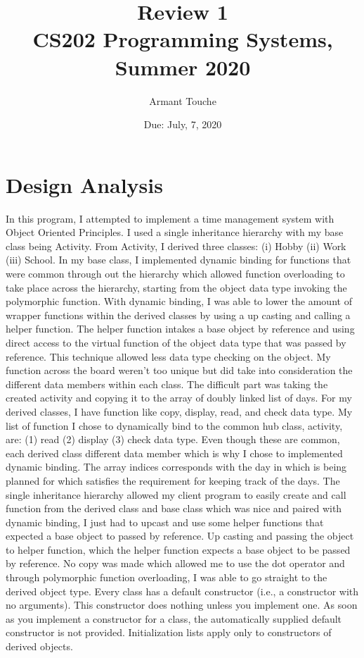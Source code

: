 \documentclass[11pt, a4paper]{article}
\title{\bf Review 1\\[1ex]
\rm\normalsize CS202 Programming Systems, Summer 2020 }
\date{\normalsize Due: July, 7, 2020}
\author{\normalsize Armant Touche}
\begin{document}
\vspace{0cm}\maketitle 

\section*{Design Analysis}

In this program, I attempted to implement a time management system with Object Oriented Principles. I used a single inheritance hierarchy with my base class being Activity. From Activity, I derived three classes: (i) Hobby (ii) Work (iii) School. In my base class, I implemented dynamic binding for functions that were common through out the hierarchy which allowed function overloading to take place across the hierarchy, starting from the object data type invoking the polymorphic function. With dynamic binding, I was able to lower the amount of wrapper functions within the derived classes by using a up casting and calling a helper function. The helper function intakes a base object by reference and using direct access to the virtual function of the object data type that was passed by reference. This technique allowed less data type checking on the object. My function across the board weren't too unique but did take into consideration the different data members within each class. The difficult part was taking the created activity and copying it to the array of doubly linked list of days. For my derived classes, I have function like copy, display, read, and check data type. My list of function I chose to dynamically bind to the common hub class, activity, are: (1) read (2) display (3) check data type. Even though these are common, each derived class different data member which is why I chose to implemented dynamic binding. The array indices corresponds with the day in which is being planned for which satisfies the requirement for keeping track of the days. The single inheritance hierarchy allowed my client program to easily create and call function from the derived class and base class which was nice and paired with dynamic binding, I just had to upcast and use some helper functions that expected a base object to passed by reference. Up casting and passing the object to helper function, which the helper function expects a base object to be passed by reference. No copy was made which allowed me to use the dot operator and through polymorphic function overloading, I was able to go straight to the derived object type. Every class has a default constructor (i.e., a constructor with no arguments). This constructor does nothing unless you implement one. As soon as you implement a constructor for a class, the automatically supplied default constructor is not provided. Initialization lists apply only to constructors of derived objects.
\end{document}
